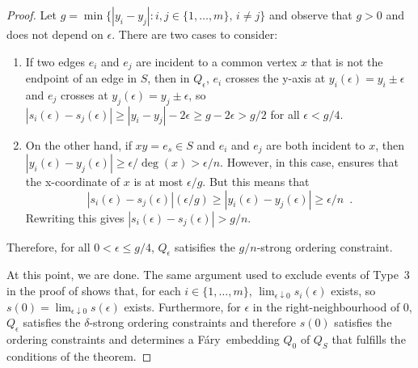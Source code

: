\documentclass{patmorin}
\newcommand{\Fary}{Fáry}
\begin{document}
\begin{proof}
  Let $g=\min\{|y_i-y_j|: i,j\in\{1,\ldots,m\},\, i\neq j\}$ and observe
  that $g>0$ and does not depend on $\epsilon$.  There are two cases
  to consider:

  \begin{enumerate}
     \item If two edges $e_i$ and $e_j$ are incident to a common
     vertex $x$ that is not the endpoint of an edge in $S$, then
     in $Q_\epsilon$, $e_i$ crosses the y-axis at $y_i(\epsilon) =
     y_i\pm\epsilon$ and $e_j$ crosses at $y_j(\epsilon)=y_j\pm\epsilon$,
     so $|s_i(\epsilon)-s_j(\epsilon)| \ge |y_i-y_j|-2\epsilon \ge
     g-2\epsilon > g/2$ for all $\epsilon < g/4$.

    \item On the other hand, if $xy=e_s\in S$ and $e_i$ and $e_j$
    are both incident to $x$, then $|y_i(\epsilon)-y_j(\epsilon)|
    \ge \epsilon/\deg(x) > \epsilon/n$.  However, in this case,
     ensures that the x-coordinate of $x$ is at
    most $\epsilon/g$.  But this means that
    \[
       |s_i(\epsilon)-s_j(\epsilon)|(\epsilon/g) 
            \ge |y_i(\epsilon)-y_j(\epsilon)| 
            \ge \epsilon/n \enspace .
    \]
    Rewriting this gives $|s_i(\epsilon)-s_j(\epsilon)| > g/n$.  
  \end{enumerate}
  Therefore, for all $0<\epsilon\le g/4$, $Q_\epsilon$ satisifies the
  $g/n$-strong ordering constraint.

  At this point, we are done. The same argument used to exclude events
  of Type~3 in the proof of  shows that, for each
  $i\in\{1,\ldots,m\}$, $\lim_{\epsilon\downarrow 0} s_i(\epsilon)$
  exists, so $s(0)=\lim_{\epsilon\downarrow 0} s(\epsilon)$ exists.
  Furthermore, for $\epsilon$ in the right-neighbourhood of $0$,
  $Q_\epsilon$ satisfies the $\delta$-strong ordering constraints and
  therefore $s(0)$ satisfies the ordering constraints and determines
  a \Fary\ embedding $Q_0$ of $Q_S$ that fulfills the conditions of
  the theorem.
\end{proof}


%
%
%
%
\end{document}
